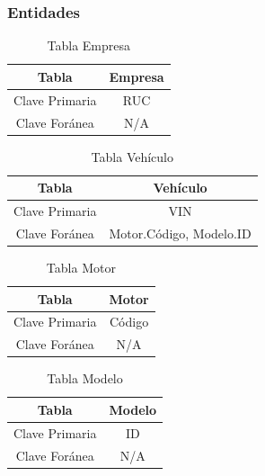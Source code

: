 \documentclass[12pt]{article}
\begin{document}
\subsubsection{Entidades}


\begin{table}[htbp]
\begin{center}
\begin{tabular}{|c|c|}
\hline
Tabla & Empresa \\
\hline
Clave Primaria & RUC \\
\hline
Clave Foránea & N/A \\
\hline
\end{tabular}
\caption{Tabla Empresa}
\label{tab:tablas}
\end{center}
\end{table}


\begin{table}[htbp]
\begin{center}
\begin{tabular}{|c|c|}
\hline
Tabla & Vehículo \\
\hline
Clave Primaria & VIN \\
\hline
Clave Foránea & Motor.Código, Modelo.ID \\
\hline
\end{tabular}
\caption{Tabla Vehículo}
\label{tab:tablas}
\end{center}
\end{table}


\begin{table}[htbp]
\begin{center}
\begin{tabular}{|c|c|}
\hline
Tabla & Motor \\
\hline
Clave Primaria & Código \\
\hline
Clave Foránea & N/A \\
\hline
\end{tabular}
\caption{Tabla Motor}
\label{tab:tablas}
\end{center}
\end{table}


\begin{table}[htbp]
\begin{center}
\begin{tabular}{|c|c|}
\hline
Tabla & Modelo \\
\hline
Clave Primaria & ID \\
\hline
Clave Foránea & N/A \\
\hline
\end{tabular}
\caption{Tabla Modelo}
\label{tab:tablas}
\end{center}
\end{table}
\end{document}
